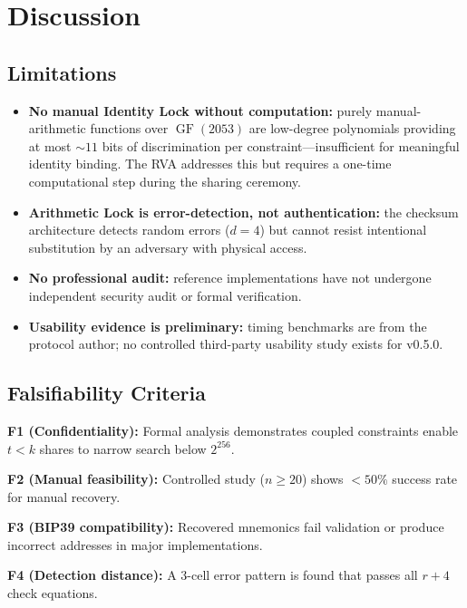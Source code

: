 \documentclass[11pt]{article}
\newcommand{\GF}{\operatorname{GF}}
\begin{document}
\section{Discussion}
\label{sec:discussion}

\subsection{Limitations}

\begin{itemize}[noitemsep]
    \item \textbf{No manual Identity Lock without computation:} purely manual-arithmetic functions over $\GF(2053)$ are low-degree polynomials providing at most ${\sim}11$ bits of discrimination per constraint---insufficient for meaningful identity binding. The RVA addresses this but requires a one-time computational step during the sharing ceremony.
    \item \textbf{Arithmetic Lock is error-detection, not authentication:} the checksum architecture detects random errors ($d = 4$) but cannot resist intentional substitution by an adversary with physical access.
    \item \textbf{No professional audit:} reference implementations have not undergone independent security audit or formal verification.
    \item \textbf{Usability evidence is preliminary:} timing benchmarks are from the protocol author; no controlled third-party usability study exists for v0.5.0.
\end{itemize}

\subsection{Falsifiability Criteria}

\textbf{F1 (Confidentiality):} Formal analysis demonstrates coupled constraints enable $t < k$ shares to narrow search below $2^{256}$.

\textbf{F2 (Manual feasibility):} Controlled study ($n \geq 20$) shows $< 50\%$ success rate for manual recovery.

\textbf{F3 (BIP39 compatibility):} Recovered mnemonics fail validation or produce incorrect addresses in major implementations.

\textbf{F4 (Detection distance):} A 3-cell error pattern is found that passes all $r + 4$ check equations.
\end{document}
